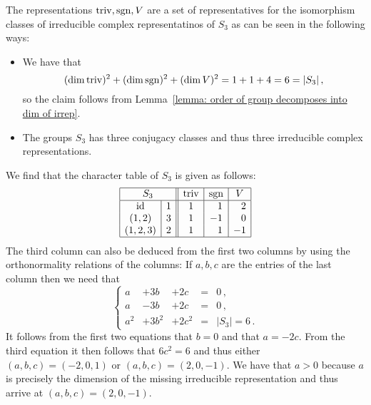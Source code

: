\begin{example}
  The representations $\operatorname{triv}, \operatorname{sgn}, V$ are a set of representatives for the isomorphism classes of irreducible complex representatinos of $S_3$ as can be seen in the following ways:
  \begin{itemize}
    \item
      We have that
      \[
          (\dim \operatorname{triv})^2
        + (\dim \operatorname{sgn})^2
        + (\dim V)^2
        = 1 + 1 + 4
        = 6
        = |S_3| \,,
      \]
      so the claim follows from Lemma~\ref{lemma: order of group decomposes into dim of irrep}.
    \item
      The groups $S_3$ has three conjugacy classes and thus three irreducible complex representations.
  \end{itemize}
  We find that the character table of $S_3$ is given as follows:
  \[
    \begin{array}{|c|c||c|c|c|}
      \hline
        \multicolumn{2}{|c||}{S_3}
      & \triv
      & \sgn
      & V
      \\
      \hline
        \id
      & 1
      &            1
      & \phantom{-}1
      & \phantom{-}2
      \\
        (1,2)
      & 3
      &            1
      &           -1
      & \phantom{-}0
      \\
        (1,2,3)
      & 2
      &            1
      & \phantom{-}1
      &           -1
      \\
      \hline
    \end{array}
  \]
  The third column can also be deduced from the first two columns by using the orthonormality relations of the columns:
  If $a, b, c$ are the entries of the last column then we need that
  \[
    \left\{
      \begin{array}{lllcl}
         a   & + 3b   & + 2c    &=& 0 \,, \\
         a   & - 3b   & + 2c    &=& 0 \,, \\
         a^2 &  +3b^2 & + 2c^2  &=& |S_3| = 6 \,.
      \end{array}
    \right.
  \]
  It follows from the first two equations that $b = 0$ and that $a = -2c$.
  From the third equation it then follows that $6c^2 = 6$ and thus either $(a,b,c) = (-2,0,1)$ or $(a,b,c) = (2,0,-1)$.
  We have that $a > 0$ because $a$ is precisely the dimension of the missing irreducible representation and thus arrive at $(a,b,c) = (2,0,-1)$.
\end{example}


